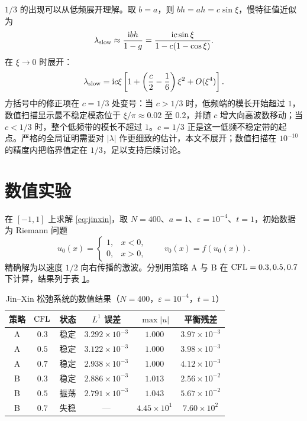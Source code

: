 $1/3$ 的出现可以从低频展开理解。取 $b=a$，则 $bh=ah=c\sin\xi$，慢特征值近似为
\begin{equation}
  \lambda_{\rm slow}\approx\frac{\mathrm{i} bh}{1-g}
  =\frac{\mathrm{i} c\sin\xi}{1-c(1-\cos\xi)}.
\end{equation}
在 $\xi\to0$ 时展开：
\begin{equation}
  \lambda_{\rm slow}
  =\mathrm{i} c\xi\left[1+\left(\frac{c}{2}-\frac{1}{6}\right)\xi^2+O(\xi^4)\right].
\end{equation}
方括号中的修正项在 $c=1/3$ 处变号：当 $c>1/3$ 时，低频端的模长开始超过 $1$，数值扫描显示最不稳定模态位于 $\xi/\pi\approx0.02$ 至 $0.2$，并随 $c$ 增大向高波数移动；当 $c<1/3$ 时，整个低频带的模长不超过 $1$。$c=1/3$ 正是这一低频不稳定带的起点。严格的全局证明需要对 $|\lambda|$ 作更细致的估计，本文不展开；数值扫描在 $10^{-10}$ 的精度内把临界值定在 $1/3$，足以支持后续讨论。

\section{数值实验}
\label{sec:jinxin-numerics}

在 $[-1,1]$ 上求解 \eqref{eq:jinxin}，取 $N=400$、$a=1$、$\varepsilon=10^{-4}$、$t=1$，初始数据为 Riemann 问题
\begin{equation}
  u_0(x)=\begin{cases}1,&x<0,\\0,&x>0,\end{cases}
  \qquad v_0(x)=f(u_0(x)).
  \label{eq:jinxin-riemann}
\end{equation}
精确解为以速度 $1/2$ 向右传播的激波。分别用策略 A 与 B 在 $\mathrm{CFL}=0.3,0.5,0.7$ 下计算，结果列于表 \ref{tab:jinxin-numerics}。

\begin{table}[htbp]
  \centering
  \caption{Jin--Xin 松弛系统的数值结果（$N=400$，$\varepsilon=10^{-4}$，$t=1$）}
  \label{tab:jinxin-numerics}
  \begin{tabular}{cccccc}
    \toprule
    策略 & $\mathrm{CFL}$ & 状态 & $L^1$ 误差 & $\max|u|$ & 平衡残差 \\
    \midrule
    A & $0.3$ & 稳定 & $3.292\times10^{-3}$ & $1.000$ & $3.97\times10^{-3}$ \\
    A & $0.5$ & 稳定 & $3.122\times10^{-3}$ & $1.000$ & $3.98\times10^{-3}$ \\
    A & $0.7$ & 稳定 & $2.938\times10^{-3}$ & $1.000$ & $4.12\times10^{-3}$ \\
    \midrule
    B & $0.3$ & 稳定 & $2.886\times10^{-3}$ & $1.013$ & $2.56\times10^{-2}$ \\
    B & $0.5$ & 振荡 & $2.791\times10^{-3}$ & $1.043$ & $5.67\times10^{-2}$ \\
    B & $0.7$ & 失稳 & --- & $4.45\times10^{1}$ & $7.60\times10^{2}$ \\
    \bottomrule
  \end{tabular}
\end{table}

